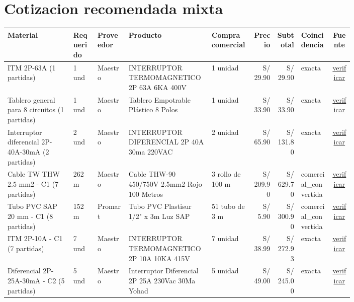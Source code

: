 \documentclass[11pt,a4paper]{article}
\begin{document}
\section{Cotizacion recomendada mixta}
\begin{landscape}
\small
\begin{longtable}{p{0.19\linewidth} p{0.07\linewidth} p{0.09\linewidth} p{0.24\linewidth} p{0.12\linewidth} r r p{0.09\linewidth} c}
\toprule Material & Requerido & Proveedor & Producto & Compra comercial & Precio & Subtotal & Coincidencia & Fuente \\ \midrule\endhead
ITM 2P-63A (1 partidas) & 1 und & Maestro & INTERRUPTOR TERMOMAGNETICO 2P 63A 6KA 400V & 1 unidad & S/ 29.90 & S/ 29.90 & exacta & \href{\detokenize{https://www.falabella.com.pe/falabella-pe/search?Ntt=interruptor+termomagnetico+2+polos+63A}}{verificar} \\
Tablero general para 8 circuitos (1 partidas) & 1 und & Maestro & Tablero Empotrable Plástico 8 Polos & 1 unidad & S/ 33.90 & S/ 33.90 & exacta & \href{\detokenize{https://www.falabella.com.pe/falabella-pe/search?Ntt=tablero+electrico+8+polos+empotrable}}{verificar} \\
Interruptor diferencial 2P-40A-30mA (2 partidas) & 2 und & Maestro & INTERRUPTOR DIFERENCIAL 2P 40A 30ma 220VAC & 2 unidad & S/ 65.90 & S/ 131.80 & exacta & \href{\detokenize{https://www.falabella.com.pe/falabella-pe/search?Ntt=interruptor+diferencial+2+polos+40A+30mA}}{verificar} \\
Cable TW THW 2.5 mm2 - C1 (7 partidas) & 262 m & Maestro & Cable THW-90 450/750V 2.5mm2 Rojo 100 Metros & 3 rollo de 100 m & S/ 209.90 & S/ 629.70 & comercial\_convertida & \href{\detokenize{https://www.falabella.com.pe/falabella-pe/search?Ntt=cable+electrico+thw+2.5+mm2+cobre}}{verificar} \\
Tubo PVC SAP 20 mm - C1 (8 partidas) & 152 m & Promart & Tubo PVC Plastisur 1/2" x 3m Luz SAP & 51 tubo de 3 m & S/ 5.90 & S/ 300.90 & comercial\_convertida & \href{\detokenize{https://www.promart.pe/tubo-pvc-plastisur-1-2-x-3m-luz-sap-162918/p}}{verificar} \\
ITM 2P-10A - C1 (7 partidas) & 7 und & Maestro & INTERRUPTOR TERMOMAGNETICO 2P 10A 10KA 415V & 7 unidad & S/ 38.99 & S/ 272.93 & exacta & \href{\detokenize{https://www.falabella.com.pe/falabella-pe/search?Ntt=interruptor+termomagnetico+2+polos+10A}}{verificar} \\
Diferencial 2P-25A-30mA - C2 (5 partidas) & 5 und & Maestro & Interruptor Diferencial 2P 25A 230Vac 30Ma Yohad & 5 unidad & S/ 49.00 & S/ 245.00 & exacta & \href{\detokenize{https://www.falabella.com.pe/falabella-pe/search?Ntt=interruptor+diferencial+2+polos+25A+30mA}}{verificar} \\

\end{longtable}
\end{landscape}
\end{document}
